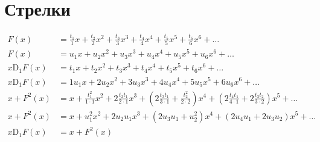 
\section{Стрелки}

\begin{equation*}
\begin{aligned}
F(x) &=
  \frac{t_1}{1} x 
+ \frac{t_2}{2} x^2
+ \frac{t_3}{3} x^3 
+ \frac{t_4}{4} x^4
+ \frac{t_5}{5} x^5 
+ \frac{t_6}{6} x^6
+ \ldots \\
%
F(x) &=
  u_1 x 
+ u_2 x^2
+ u_3 x^3 
+ u_4 x^4
+ u_5 x^5 
+ u_6 x^6
+ \ldots \\
%
x \mathrm{D}_1{F(x)} &=
  t_1 x
+ t_2 x^2
+ t_3 x^3
+ t_4 x^4
+ t_5 x^5
+ t_6 x^6
+ \ldots \\
%
x \mathrm{D}_1{F(x)} &=
  1 u_1 x
+ 2 u_2 x^2
+ 3 u_3 x^3
+ 4 u_4 x^4
+ 5 u_5 x^5
+ 6 u_6 x^6
+ \ldots \\
%
x + F^2(x) &=
  x
+ \frac{t_1^2}{1 \cdot 1} x^2 
+ 2 \frac{t_2 t_1}{2 \cdot 1} x^3 
+ \left(2 \frac{t_3 t_1}{3 \cdot 1} + \frac{t_2^2}{2 \cdot 2} \right) x^4 
+ \left(2 \frac{t_4 t_1}{4 \cdot 1} + 2 \frac{t_3 t_2}{3 \cdot 2} \right) x^5 + \ldots \\
%
x + F^2(x) &=
  x
+ u_1^2 x^2 
+ 2 u_2 u_1 x^3 
+ \left(2 u_3 u_1 + u_2^2 \right) x^4 
+ \left(2 u_4 u_1 + 2 u_3 u_2 \right) x^5
+ \ldots \\
%
x \mathrm{D}_1{F(x)} &= x + F^2(x) \\
%
\end{aligned}
\end{equation*}

